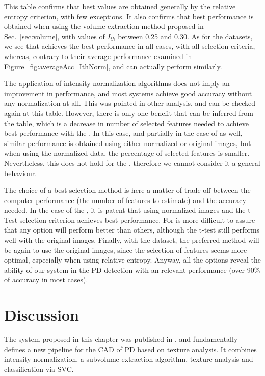 This table confirms that best values are obtained generally by the relative entropy criterion, with few exceptions. It also confirms that best performance is obtained when using the volume extraction method proposed in Sec.~\ref{sec:volume}, with values of $I_{th}$ between 0.25 and 0.30. As for the datasets, we see that \ppmidat{} achieves the best performance in all cases, with all selection criteria, whereas, contrary to their average performance examined in Figure~\ref{fig:averageAcc_IthNorm}, \vdlvdat{}{} and \vdlvdat{} can actually perform similarly. 

The application of intensity normalization algorithms does not imply an improvement in performance, and most systems achieve good accuracy without any normalization at all. This was pointed in other analysis, and can be checked again at this table. However, there is only one benefit that can be inferred from the table, which is a decrease in number of selected features needed to achieve best performance with the \ppmidat{}. In this case, and partially in the case of \vdlvdat{}{} as well, similar performance is obtained using either normalized or original images, but when using the normalized data, the percentage of selected features is smaller. Nevertheless, this does not hold for the \vdlvdat{}, therefore we cannot consider it a general behaviour. 

The choice of a best selection method is here a matter of trade-off between the computer performance (the number of features to estimate) and the accuracy needed. In the case of the \ppmidat{}, it is patent that using normalized images and the t-Test selection criterion achieves best performance. For \vdlvdat{}{} is more difficult to assure that any option will perform better than others, although the t-test still performs well with the original images. Finally, with the \vdlvdat{} dataset, the preferred method will be again to use the original images, since the selection of features seems more optimal, especially when using relative entropy. Anyway, all the options reveal the ability of our system in the PD detection with an relevant performance (over 90\% of accuracy in most cases). 

\section{Discussion}\label{sec:ch5discuss}
The system proposed in this chapter was published in \cite{Martinez-Murcia2013266,martinez2014parametrization}, and fundamentally defines a new pipeline for the \ac{CAD} of \ac{PD} based on texture analysis. It combines intensity normalization, a subvolume extraction algorithm, texture analysis and classification via \ac{SVC}. 

